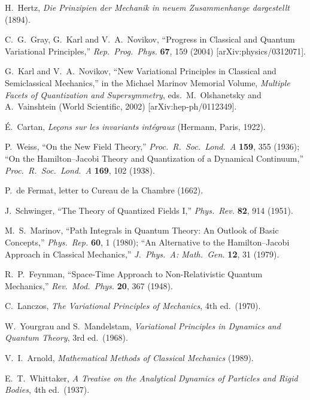 \documentclass[11pt]{book}
\theoremstyle{definition}
\theoremstyle{plain}
\theoremstyle{remark}
\begin{document}
\begin{enumerate}[label={[\arabic*]}, itemsep=1pt]
\item H.~Hertz, \emph{Die Prinzipien der Mechanik in neuem Zusammenhange dargestellt} (1894).
\item C.~G.~Gray, G.~Karl and V.~A.~Novikov, ``Progress in Classical and Quantum Variational Principles,'' \emph{Rep.\ Prog.\ Phys.} \textbf{67}, 159 (2004) [arXiv:physics/0312071].
\item G.~Karl and V.~A.~Novikov, ``New Variational Principles in Classical and Semiclassical Mechanics,'' in the Michael Marinov Memorial Volume, \emph{Multiple Facets of Quantization and Supersymmetry}, eds.\ M.~Olshanetsky and A.~Vainshtein (World Scientific, 2002) [arXiv:hep-ph/0112349].
\item É.~Cartan, \emph{Leçons sur les invariants intégraux} (Hermann, Paris, 1922).
\item P.~Weiss, ``On the New Field Theory,'' \emph{Proc.\ R.\ Soc.\ Lond.\ A} \textbf{159}, 355 (1936); ``On the Hamilton--Jacobi Theory and Quantization of a Dynamical Continuum,'' \emph{Proc.\ R.\ Soc.\ Lond.\ A} \textbf{169}, 102 (1938).
\item P.~de Fermat, letter to Cureau de la Chambre (1662).
\item J.~Schwinger, ``The Theory of Quantized Fields I,'' \emph{Phys.\ Rev.} \textbf{82}, 914 (1951).
\item M.~S.~Marinov, ``Path Integrals in Quantum Theory: An Outlook of Basic Concepts,'' \emph{Phys.\ Rep.} \textbf{60}, 1 (1980); ``An Alternative to the Hamilton--Jacobi Approach in Classical Mechanics,'' \emph{J.\ Phys.\ A: Math.\ Gen.} \textbf{12}, 31 (1979).
\item R.~P.~Feynman, ``Space-Time Approach to Non-Relativistic Quantum Mechanics,'' \emph{Rev.\ Mod.\ Phys.} \textbf{20}, 367 (1948).
\item C.~Lanczos, \emph{The Variational Principles of Mechanics}, 4th ed.\ (1970).
\item W.~Yourgrau and S.~Mandelstam, \emph{Variational Principles in Dynamics and Quantum Theory}, 3rd ed.\ (1968).
\item V.~I.~Arnold, \emph{Mathematical Methods of Classical Mechanics} (1989).
\item E.~T.~Whittaker, \emph{A Treatise on the Analytical Dynamics of Particles and Rigid Bodies}, 4th ed.\ (1937).
\end{enumerate}
\end{document}
